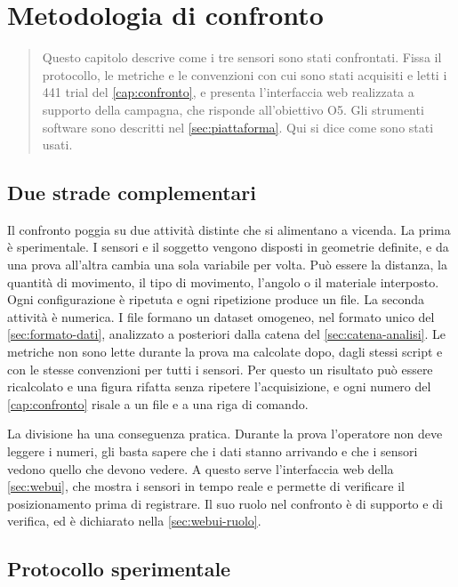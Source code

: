 \chapter{Metodologia di confronto}
\label{cap:metodologia}

\begin{quote}\small
Questo capitolo descrive come i tre sensori sono stati confrontati. Fissa il
protocollo, le metriche e le convenzioni con cui sono stati acquisiti e letti i 441
trial del \cref{cap:confronto}, e presenta l'interfaccia web realizzata a supporto
della campagna, che risponde all'obiettivo O5. Gli strumenti software sono descritti
nel \cref{sec:piattaforma}. Qui si dice come sono stati usati.
\end{quote}

\section{Due strade complementari}
\label{sec:metodo-approccio}

Il confronto poggia su due attività distinte che si alimentano a vicenda. La prima
è sperimentale. I sensori e il soggetto vengono disposti in geometrie definite, e da
una prova all'altra cambia una sola variabile per volta. Può essere la distanza, la
quantità di movimento, il tipo di movimento, l'angolo o il materiale interposto.
Ogni configurazione è ripetuta e ogni ripetizione produce un file. La seconda
attività è numerica. I file formano un dataset omogeneo, nel formato unico del
\cref{sec:formato-dati}, analizzato a posteriori dalla catena del
\cref{sec:catena-analisi}. Le metriche non sono lette durante la prova ma calcolate
dopo, dagli stessi script e con le stesse convenzioni per tutti i sensori. Per questo
un risultato può essere ricalcolato e una figura rifatta senza ripetere
l'acquisizione, e ogni numero del \cref{cap:confronto} risale a un file e a una riga
di comando.

La divisione ha una conseguenza pratica. Durante la prova l'operatore non deve
leggere i numeri, gli basta sapere che i dati stanno arrivando e che i sensori
vedono quello che devono vedere. A questo serve l'interfaccia web della
\cref{sec:webui}, che mostra i sensori in tempo reale e permette di verificare il
posizionamento prima di registrare. Il suo ruolo nel confronto è di supporto e di
verifica, ed è dichiarato nella \cref{sec:webui-ruolo}.

\section{Protocollo sperimentale}
\label{sec:protocollo}
\label{sec:registro}

